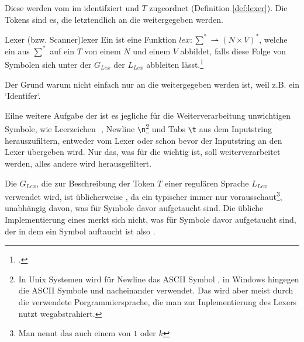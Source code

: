 Diese  werden vom  im  identifziert und  $T$ zugeordnet (Definition \ref{def:lexer}). Die Tokens sind es, die letztendlich an die  weitergegeben werden.

\begin{Definition}{Lexer (bzw. Scanner)}{lexer}
  Ein  ist eine  Funktion \hspace{0.2cm}$lex: \sum^{*} \rightharpoonup (N \times V)^{*}$, welche ein  aus $\sum^{*}$ auf ein  $T$ von einem  $N$ und einem   $V$ abbildet, falls diese Folge von Symbolen sich unter der  ${G}_{Lex}$ der  ${L_{Lex}}$ abbleiten lässt.\footcite{noauthor_lecture-notes-2021_2022}
\end{Definition}

Der Grund warum nicht einfach nur  an die  weitergegeben werden ist, weil z.B. ein `Identifer`.

Eilne weitere Aufgabe der  ist es jegliche für die Weiterverarbeitung unwichtigen Symbole, wie Leerzeichen \,\textvisiblespace\,, Newline \verb|\n|\footnote{In Unix Systemen wird für Newline das ASCII Symbol , in Windows hingegen die ASCII Symbole  und  nacheinander verwendet. Das wird aber meist durch die verwendete Porgrammiersprache, die man zur Inplementierung des Lexers nutzt wegabstrahiert.} und Tabs \verb|\t| aus dem Inputstring herauszufiltern, entweder vom Lexer oder schon bevor der Inputstring an den Lexer übergeben wird. Nur das, was für die  wichtig ist, soll weiterverarbeitet werden, alles andere wird herausgefiltert.

\begin{special_paragraph}
  Die  $G_{Lex}$, die zur Beschreibung der Token $T$ einer regulären Sprache $L_{Lex}$ verwendet wird, ist üblicherweise , da ein typischer  immer nur  vorausschaut\footnote{Man nennt das auch einem  von $1$ oder $k$}, unabhängig davon, was für Symbole davor aufgetaucht sind. Die übliche Implementierung eines  merkt sich nicht, was für Symbole davor aufgetaucht sind, der  in dem ein Symbol auftaucht ist also .
\end{special_paragraph}

